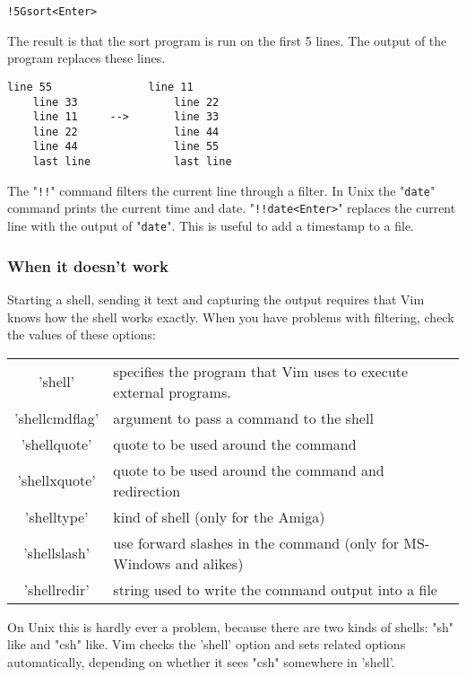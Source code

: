 \begin{Verbatim}[samepage=true]
 !5Gsort<Enter>
\end{Verbatim}

The result is that the sort program is run on the first 5 lines.
The output of the program replaces these lines.

\begin{Verbatim}[samepage=true]
    line 55               line 11
    line 33               line 22
    line 11     -->       line 33
    line 22               line 44
    line 44               line 55
    last line             last line
\end{Verbatim}

The "\verb:!!:" command filters the current line through a filter.
In Unix the "\verb!date!" command prints the current time and date.
"\verb:!!date<Enter>:" replaces the current line with the output of "\verb!date!".
This is useful to add a timestamp to a file.

\subsubsection{When it doesn't work}
Starting a shell, sending it text and capturing the output requires that Vim knows how the shell works exactly.
When you have problems with filtering, check the values of these options:

\begin{center}\begin{longtable}{c l}
				'shell' & specifies the program that Vim uses to execute external programs. \\
				'shellcmdflag' & argument to pass a command to the shell \\
				'shellquote' & quote to be used around the command \\
				'shellxquote' & quote to be used around the command and redirection \\
				'shelltype' & kind of shell (only for the Amiga) \\
				'shellslash' & use forward slashes in the command (only for MS-Windows and alikes) \\
				'shellredir' & string used to write the command output into a file \\
\end{longtable}\end{center}

On Unix this is hardly ever a problem, because there are two kinds of shells: "sh" like and "csh" like.
Vim checks the 'shell' option and sets related options automatically, depending on whether it sees "csh" somewhere in 'shell'.

